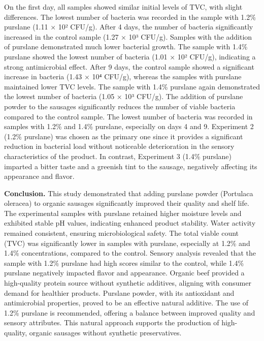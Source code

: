 On the first day, all samples showed similar initial levels of TVC, with
slight differences. The lowest number of bacteria was recorded in the
sample with 1.2\% purslane (1.11 × 10² CFU/g). After 4 days, the number
of bacteria significantly increased in the control sample (1.27 × 10³
CFU/g). Samples with the addition of purslane demonstrated much lower
bacterial growth. The sample with 1.4\% purslane showed the lowest
number of bacteria (1.01 × 10² CFU/g), indicating a strong antimicrobial
effect. After 9 days, the control sample showed a significant increase
in bacteria (1.43 × 10⁴ CFU/g), whereas the samples with purslane
maintained lower TVC levels. The sample with 1.4\% purslane again
demonstrated the lowest number of bacteria (1.05 × 10³ CFU/g). The
addition of purslane powder to the sausages significantly reduces the
number of viable bacteria compared to the control sample. The lowest
number of bacteria was recorded in samples with 1.2\% and 1.4\%
purslane, especially on days 4 and 9. Experiment 2 (1.2\% purslane) was
chosen as the primary one since it provides a significant reduction in
bacterial load without noticeable deterioration in the sensory
characteristics of the product. In contrast, Experiment 3 (1.4\%
purslane) imparted a bitter taste and a greenish tint to the sausage,
negatively affecting its appearance and flavor.

{\bfseries Conclusion.} This study demonstrated that adding purslane powder
(Portulaca oleracea) to organic sausages significantly improved their
quality and shelf life. The experimental samples with purslane retained
higher moisture levels and exhibited stable pH values, indicating
enhanced product stability. Water activity remained consistent, ensuring
microbiological safety. The total viable count (TVC) was significantly
lower in samples with purslane, especially at 1.2\% and 1.4\%
concentrations, compared to the control. Sensory analysis revealed that
the sample with 1.2\% purslane had high scores similar to the control,
while 1.4\% purslane negatively impacted flavor and appearance. Organic
beef provided a high-quality protein source without synthetic additives,
aligning with consumer demand for healthier products. Purslane powder,
with its antioxidant and antimicrobial properties, proved to be an
effective natural additive. The use of 1.2\% purslane is recommended,
offering a balance between improved quality and sensory attributes. This
natural approach supports the production of high-quality, organic
sausages without synthetic preservatives.

